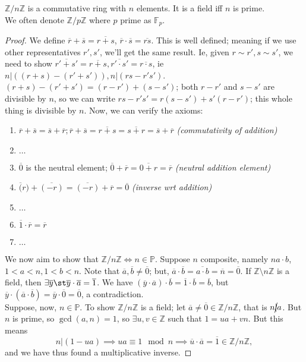 \documentclass[12pt,oneside]{article}
\begin{document}
\begin{theorem}\label{thm:zmodnzringfield}
  $\mathbb{Z}/ n \mathbb{Z}$ is a commutative ring with $n$ elements. It is a field iff $n$ is prime.\\
  We often denote $\mathbb{Z}/p \mathbb{Z}$ where $p$ prime as $\mathbb{F}_p$.
\end{theorem}
\begin{proof}
  We define $\overline{r} + \overline{s} = \overline{r + s}$, $\overline{r} \cdot \overline{s} = \overline{rs}$. This is well defined; meaning if we use other representatives $r', s'$, we'll get the same result. Ie, given $r \sim r', s \sim s'$, we need to show $\overline{r' + s'} = \overline{r+s}, \overline{r'\cdot s'} = \overline{r \cdot s}$, ie $n | ((r+s) - (r'+s')), n | (rs - r's')$.\\
  $(r+s) - (r'+s') = (r - r') + (s-s')$; both $r-r'$ and $s - s'$ are divisible by $n$, so we can write $rs - r's' = r(s-s') + s'(r-r')$; this whole thing is divisible by $n$. Now, we can verify the axioms:
  \begin{enumerate}
    \item $\overline{r} + \overline{s} = \overline{s} + \overline{r}; \overline{r} + \overline{s} = \overline{r+s} = \overline{s + r} = \overline{s} + \overline{r}$ \quad \textit{(commutativity of addition)}
    \item $\dots$
    \item $\overline{0}$ is the neutral element; $\overline{0} + \overline{r} = \overline{0 + r} = \overline{r}$ \quad \textit{(neutral addition element)}
    \item $\overline(r) + \overline{(-r)} = \overline{(-r)} + \overline{r} = \overline{0}$ \quad \textit{(inverse wrt addition)}
    \item $\dots$
    \item $\overline{1} \cdot \overline{r} = \overline{r}$
    \item $\dots$
  \end{enumerate}

  We now aim to show that $\mathbb{Z} /n \mathbb{Z} \iff n \in \mathbb{P}$. Suppose $n$ composite, namely $n a \cdot b$, $1 < a < n, 1 < b < n$. Note that $\overline{a}, \overline{b} \neq \overline{0}$; but, $\overline{a}\cdot \overline{b} = \overline{a \cdot b} = \overline{n} = \overline{0}$. If $\mathbb{Z}\setminus n \mathbb{Z}$ is a field, then $\exists \overline{y} \st \overline{y} \cdot \overline a = \overline{1}$. We have $(\overline{y} \cdot \overline{a}) \cdot \overline{b} = \overline{1} \cdot \overline{b} = \overline{b}$, but $\overline{y}\cdot (\overline{a} \cdot \overline{b}) = \overline{y} \cdot \overline{0} = \overline{0}$, a contradiction.\\
  Suppose, now, $n \in \mathbb{P}$. To show $\mathbb{Z}/n \mathbb{Z}$ is a field; let $\overline{a}  \neq \overline{0} \in \mathbb{Z}/n \mathbb{Z}$, that is $n \cancel{|}a$. But $n$ is prime, so $\gcd(a,n) = 1$, so $\exists u,v \in \mathbb{Z}$ such that $1 = ua + vn$. But this means $$n|(1-ua) \implies ua \equiv 1 \mod n \implies \overline{u} \cdot \overline{a} = \overline{1} \in \mathbb{Z}/n \mathbb{Z},$$ and we have thus found a multiplicative inverse.
\end{proof}
\end{document}
